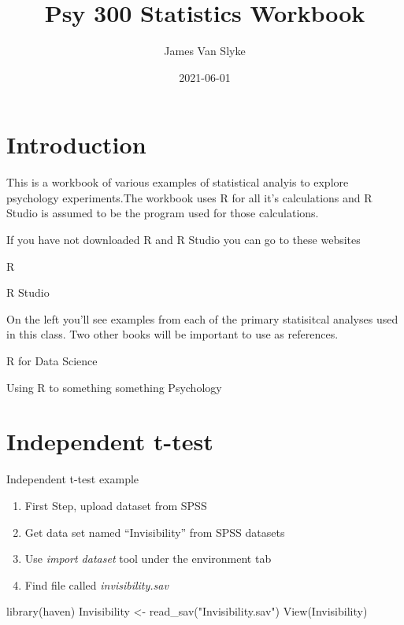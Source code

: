 \documentclass[
]{book}
\title{Psy 300 Statistics Workbook}
\author{James Van Slyke}
\date{2021-06-01}
\newenvironment{Shaded}{\begin{snugshade}}{\end{snugshade}}
\newcommand{\FunctionTok}[1]{\textcolor[rgb]{0.00,0.00,0.00}{#1}}
\newcommand{\NormalTok}[1]{#1}
\newcommand{\OtherTok}[1]{\textcolor[rgb]{0.56,0.35,0.01}{#1}}
\newcommand{\StringTok}[1]{\textcolor[rgb]{0.31,0.60,0.02}{#1}}
\providecommand{\tightlist}{%
  \setlength{\itemsep}{0pt}\setlength{\parskip}{0pt}}
\begin{document}
\maketitle

{
\setcounter{tocdepth}{1}
\tableofcontents
}
\hypertarget{introduction}{%
\chapter{Introduction}\label{introduction}}

This is a workbook of various examples of statistical analyis to explore psychology experiments.The workbook uses R for all it's calculations and R Studio is assumed to be the program used for those calculations.

If you have not downloaded R and R Studio you can go to these websites

R

R Studio

On the left you'll see examples from each of the primary statisitcal analyses used in this class. Two other books will be important to use as references.

R for Data Science

Using R to something something Psychology

\hypertarget{independent-t-test}{%
\chapter{Independent t-test}\label{independent-t-test}}

Independent t-test example

\begin{enumerate}
\def\labelenumi{\arabic{enumi}.}
\tightlist
\item
  First Step, upload dataset from SPSS
\item
  Get data set named ``Invisibility'' from SPSS datasets
\item
  Use \emph{import dataset} tool under the environment tab
\item
  Find file called \emph{invisibility.sav}
\end{enumerate}

\begin{Shaded}
\begin{Highlighting}[]
\FunctionTok{library}\NormalTok{(haven)}
\NormalTok{Invisibility }\OtherTok{\textless{}{-}} \FunctionTok{read\_sav}\NormalTok{(}\StringTok{"Invisibility.sav"}\NormalTok{)}
\FunctionTok{View}\NormalTok{(Invisibility)}
\end{Highlighting}
\end{Shaded}
\end{document}
